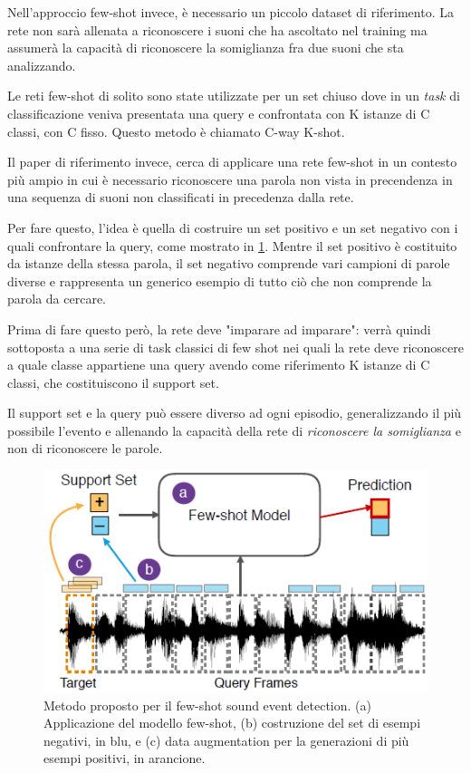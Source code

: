 \documentclass[12pt,a4paper,titlepage]{article}
\begin{document}
Nell'approccio few-shot invece, è necessario un piccolo dataset di riferimento. La rete non sarà allenata a riconoscere i suoni che ha ascoltato nel training ma assumerà la capacità di riconoscere la somiglianza fra due suoni che sta analizzando.

Le reti few-shot di solito sono state utilizzate per un set chiuso dove in un \textit{task} di classificazione veniva presentata una query e confrontata con K istanze di C classi, con C fisso.
Questo metodo è chiamato C-way K-shot.

Il paper di riferimento invece, cerca di applicare una rete few-shot in un contesto più ampio in cui è necessario riconoscere una parola non vista in precendenza in una sequenza di suoni non classificati in precedenza dalla rete.

Per fare questo, l'idea è quella di costruire un set positivo e un set negativo con i quali confrontare la query, come mostrato in \ref{fig:few_shot_sound_event_detection_method}. Mentre il set positivo è costituito da istanze della stessa parola, il set negativo comprende vari campioni di parole diverse e rappresenta un generico esempio di tutto ciò che non comprende la parola da cercare.

Prima di fare questo però, la rete deve "imparare ad imparare": verrà quindi sottoposta a una serie di task classici di few shot nei quali la rete deve riconoscere a quale classe appartiene una query avendo come riferimento K istanze di C classi, che costituiscono il support set.

Il support set e la query può essere diverso ad ogni episodio, generalizzando il più possibile l'evento e allenando la capacità della rete di \textit{riconoscere la somiglianza} e non di riconoscere le parole.


\begin{figure}[h]
	\centering	
	\includegraphics[width=.5\textwidth]{Immagini/few_shot_sound_event_detection_method}
	\caption{Metodo proposto per il few-shot sound event detection. (a) Applicazione del modello few-shot, (b) costruzione del set di esempi negativi, in blu, e (c) data augmentation per la generazioni di più esempi positivi, in arancione.~\cite{Salamon:Few-Shot}}
	\label{fig:few_shot_sound_event_detection_method}
\end{figure}
\end{document}
